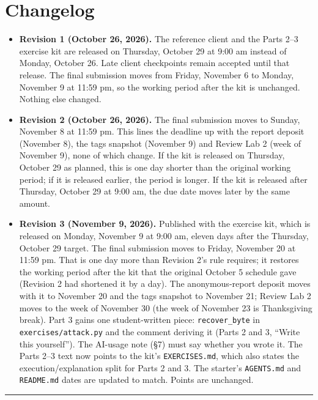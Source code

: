 \documentclass[11pt]{article}
\begin{document}
\section*{Changelog}

\begin{itemize}
\item \textbf{Revision 1 (October 26, 2026).} The reference client and the Parts 2--3 exercise kit are released on Thursday, October 29 at 9:00 am instead of Monday, October 26. Late client checkpoints remain accepted until that release. The final submission moves from Friday, November 6 to Monday, November 9 at 11:59 pm, so the working period after the kit is unchanged. Nothing else changed.
\item \textbf{Revision 2 (October 26, 2026).} The final submission moves to Sunday, November 8 at 11:59 pm. This lines the deadline up with the report deposit (November 8), the tags snapshot (November 9) and Review Lab 2 (week of November 9), none of which change. If the kit is released on Thursday, October 29 as planned, this is one day shorter than the original working period; if it is released earlier, the period is longer. If the kit is released after Thursday, October 29 at 9:00 am, the due date moves later by the same amount.
\item \textbf{Revision 3 (November 9, 2026).} Published with the exercise kit, which is released on Monday, November 9 at 9:00 am, eleven days after the Thursday, October 29 target. The final submission moves to Friday, November 20 at 11:59 pm. That is one day more than Revision 2's rule requires; it restores the working period after the kit that the original October 5 schedule gave (Revision 2 had shortened it by a day). The anonymous-report deposit moves with it to November 20 and the tags snapshot to November 21; Review Lab 2 moves to the week of November 30 (the week of November 23 is Thanksgiving break). Part 3 gains one student-written piece: \texttt{recover\_byte} in \texttt{exercises/attack.py} and the comment deriving it (Parts 2 and 3, ``Write this yourself''). The AI-usage note (\S{}7) must say whether you wrote it. The Parts 2--3 text now points to the kit's \texttt{EXERCISES.md}, which also states the execution/explanation split for Parts 2 and 3. The starter's \texttt{AGENTS.md} and \texttt{README.md} dates are updated to match. Points are unchanged.
\end{itemize}
\bigskip
\noindent\rule{\textwidth}{0.4pt}
\end{document}
